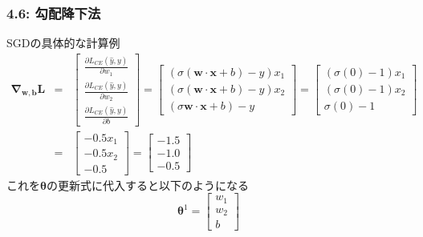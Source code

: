 \documentclass[unicode,11pt]{beamer} %
\begin{document}
\begin{frame}
    \frametitle{4.6: 勾配降下法}
    \begin{exampleblock}{SGDの具体的な計算例}
        \begin{eqnarray*}
            \boldsymbol{\nabla_{w, b} L} &=& 
            \begin{bmatrix}
                \frac{\partial L_{CE} (\hat{y}, y)}{\partial w_1} \\
                \frac{\partial L_{CE} (\hat{y}, y)}{\partial w_2} \\
                \frac{\partial L_{CE} (\hat{y}, y)}{\partial b}
            \end{bmatrix} 
            =
            \begin{bmatrix}
                (\sigma (\boldsymbol{w} \cdot \boldsymbol{x} + b) - y)x_1 \\
                (\sigma (\boldsymbol{w} \cdot \boldsymbol{x} + b) - y)x_2 \\
                (\sigma \boldsymbol{w} \cdot \boldsymbol{x} + b) - y
            \end{bmatrix}
            =
            \begin{bmatrix}
                (\sigma (0) - 1)x_1\\
                (\sigma (0) - 1)x_2\\
                \sigma (0) - 1
            \end{bmatrix} \\
            &=&
            \begin{bmatrix}
                -0.5x_1\\
                -0.5x_2\\
                -0.5
            \end{bmatrix}
            =
            \begin{bmatrix}
                -1.5\\
                -1.0\\
                -0.5
            \end{bmatrix}
        \end{eqnarray*}
        これを$\boldsymbol{\theta}$の更新式に代入すると以下のようになる
        \begin{equation*}
            \boldsymbol{\theta}^1 = 
            \begin{bmatrix}
                w_1\\
                w_2\\
                b
            \end{bmatrix}

\end{equation*}
\end{exampleblock}
\end{frame}
\end{document}
